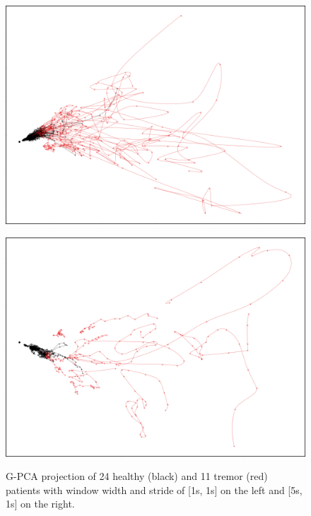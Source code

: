 \begin{figure}
\centering
\begin{minipage}{.47\textwidth}
    \centering
    \includegraphics[width=\linewidth]{figures/nemo/exp1.png}
    \label{fig:exp1-gpca-1s-1s}
\end{minipage}%
\begin{minipage}{.47\textwidth}
    \centering
    \includegraphics[width=\linewidth]{figures/nemo/exp1-5s-window.png}
    \label{fig:exp1-gpca-5s-1s}
\end{minipage}
\caption{G-PCA projection of 24 healthy (black) and 11 tremor (red) patients with window width and stride of [1s, 1s] on the left and [5s, 1s] on the right.}
\end{figure}

